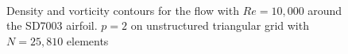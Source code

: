 \begin{figure}[htbp]
\centering
{}
\\

\caption{Density and vorticity contours for the flow with $Re = 10,000$ around the SD7003 airfoil. $p=2$ on unstructured triangular grid with $N = 25,810$ elements}
\label{sdairfoilre10k}
\end{figure}

